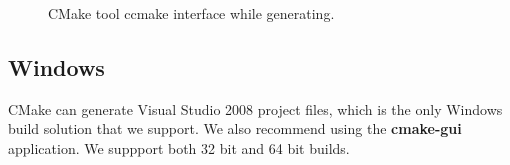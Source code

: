 \documentclass[fleqn,12pt,openany]{book}
\begin{document}
\begin{figure}[H]
\caption{CMake tool ccmake interface while generating.}
\end{figure}


\subsection{Windows}

CMake can generate Visual Studio 2008 project files, which is the only Windows build
solution that we support.
We also recommend using the \textbf{cmake-gui} application.
We suppport both 32 bit and 64 bit builds.
\end{document}
